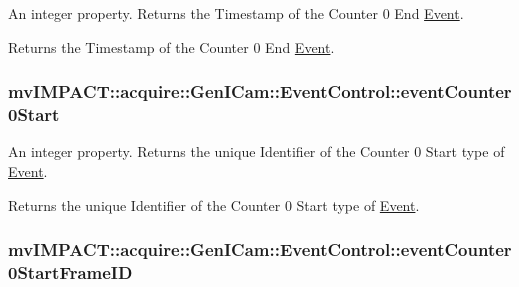 An integer property. Returns the Timestamp of the Counter 0 End \hyperlink{classmv_i_m_p_a_c_t_1_1acquire_1_1_event}{Event}. 

Returns the Timestamp of the Counter 0 End \hyperlink{classmv_i_m_p_a_c_t_1_1acquire_1_1_event}{Event}. \hypertarget{classmv_i_m_p_a_c_t_1_1acquire_1_1_gen_i_cam_1_1_event_control_a529e74585b2328738c40ade2e007e2ce}{
\subsubsection[{event\+Counter0\+Start}]{ mv\+I\+M\+P\+A\+C\+T\+::acquire\+::\+Gen\+I\+Cam\+::\+Event\+Control\+::event\+Counter0\+Start}}\label{classmv_i_m_p_a_c_t_1_1acquire_1_1_gen_i_cam_1_1_event_control_a529e74585b2328738c40ade2e007e2ce}


An integer property. Returns the unique Identifier of the Counter 0 Start type of \hyperlink{classmv_i_m_p_a_c_t_1_1acquire_1_1_event}{Event}. 

Returns the unique Identifier of the Counter 0 Start type of \hyperlink{classmv_i_m_p_a_c_t_1_1acquire_1_1_event}{Event}. \hypertarget{classmv_i_m_p_a_c_t_1_1acquire_1_1_gen_i_cam_1_1_event_control_a2ecf85313a9c0ed8e21fa32a6d6bfb12}{
\subsubsection[{event\+Counter0\+Start\+Frame\+I\+D}]{ mv\+I\+M\+P\+A\+C\+T\+::acquire\+::\+Gen\+I\+Cam\+::\+Event\+Control\+::event\+Counter0\+Start\+Frame\+I\+D}}\label{classmv_i_m_p_a_c_t_1_1acquire_1_1_gen_i_cam_1_1_event_control_a2ecf85313a9c0ed8e21fa32a6d6bfb12}


